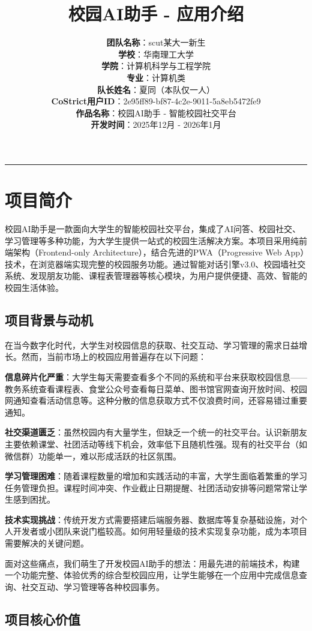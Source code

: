 \documentclass[12pt,a4paper]{article}
\title{\textbf{校园AI助手 - 应用介绍}}
\author{
    \textbf{团队名称}：scut某大一新生 \\
    \vspace{0.3cm}
    \textbf{学校}：华南理工大学 \\
    \vspace{0.3cm}
    \textbf{学院}：计算机科学与工程学院 \\
    \vspace{0.3cm}
    \textbf{专业}：计算机类 \\
    \vspace{0.3cm}
    \textbf{队长姓名}：夏同（本队仅一人） \\
    \vspace{0.3cm}
    \textbf{CoStrict用户ID}：2e95ff89-bf87-4c2e-9011-5a8eb5472fe9 \\
    \vspace{0.3cm}
    \textbf{作品名称}：校园AI助手 - 智能校园社交平台 \\
    \vspace{0.3cm}
    \textbf{开发时间}：2025年12月 - 2026年1月
}
\date{}
\begin{document}
\maketitle

\hrule
\vspace{1cm}

\section{项目简介}

校园AI助手是一款面向大学生的智能校园社交平台，集成了AI问答、校园社交、学习管理等多种功能，为大学生提供一站式的校园生活解决方案。本项目采用纯前端架构（Frontend-only Architecture），结合先进的PWA（Progressive Web App）技术，在浏览器端实现完整的校园服务功能。通过智能对话引擎v3.0、校园墙社交系统、发现朋友功能、课程表管理器等核心模块，为用户提供便捷、高效、智能的校园生活体验。

\subsection{项目背景与动机}

在当今数字化时代，大学生对校园信息的获取、社交互动、学习管理的需求日益增长。然而，当前市场上的校园应用普遍存在以下问题：

\textbf{信息碎片化严重}：大学生每天需要查看多个不同的系统和平台来获取校园信息——教务系统查看课程表、食堂公众号查看每日菜单、图书馆官网查询开放时间、校园网通知查看活动信息等。这种分散的信息获取方式不仅浪费时间，还容易错过重要通知。

\textbf{社交渠道匮乏}：虽然校园内有大量学生，但缺乏一个统一的社交平台。认识新朋友主要依赖课堂、社团活动等线下机会，效率低下且随机性强。现有的社交平台（如微信群）功能单一，难以形成活跃的社区氛围。

\textbf{学习管理困难}：随着课程数量的增加和实践活动的丰富，大学生面临着繁重的学习任务管理负担。课程时间冲突、作业截止日期提醒、社团活动安排等问题常常让学生感到困扰。

\textbf{技术实现挑战}：传统开发方式需要搭建后端服务器、数据库等复杂基础设施，对个人开发者或小团队来说门槛较高。如何用轻量级的技术实现复杂功能，成为本项目需要解决的关键问题。

面对这些痛点，我们萌生了开发校园AI助手的想法：用最先进的前端技术，构建一个功能完整、体验优秀的综合型校园应用，让学生能够在一个应用中完成信息查询、社交互动、学习管理等各种校园事务。

\subsection{项目核心价值}
\end{document}
